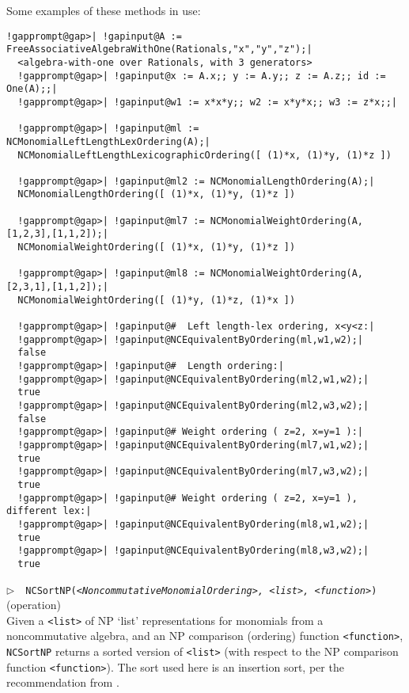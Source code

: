 \documentclass[a4paper,11pt]{report}
\begin{document}
{{{ Some examples of these methods in use: 
\begin{Verbatim}[commandchars=!@|,fontsize=\small,frame=single,label=Example]
  !gapprompt@gap>| !gapinput@A := FreeAssociativeAlgebraWithOne(Rationals,"x","y","z");|
  <algebra-with-one over Rationals, with 3 generators>
  !gapprompt@gap>| !gapinput@x := A.x;; y := A.y;; z := A.z;; id := One(A);;|
  !gapprompt@gap>| !gapinput@w1 := x*x*y;; w2 := x*y*x;; w3 := z*x;;|
  
  !gapprompt@gap>| !gapinput@ml := NCMonomialLeftLengthLexOrdering(A);|
  NCMonomialLeftLengthLexicographicOrdering([ (1)*x, (1)*y, (1)*z ])
  
  !gapprompt@gap>| !gapinput@ml2 := NCMonomialLengthOrdering(A);|
  NCMonomialLengthOrdering([ (1)*x, (1)*y, (1)*z ])
  
  !gapprompt@gap>| !gapinput@ml7 := NCMonomialWeightOrdering(A,[1,2,3],[1,1,2]);|
  NCMonomialWeightOrdering([ (1)*x, (1)*y, (1)*z ])
  
  !gapprompt@gap>| !gapinput@ml8 := NCMonomialWeightOrdering(A,[2,3,1],[1,1,2]);|
  NCMonomialWeightOrdering([ (1)*y, (1)*z, (1)*x ])
  
  !gapprompt@gap>| !gapinput@#  Left length-lex ordering, x<y<z:|
  !gapprompt@gap>| !gapinput@NCEquivalentByOrdering(ml,w1,w2);|
  false
  !gapprompt@gap>| !gapinput@#  Length ordering:|
  !gapprompt@gap>| !gapinput@NCEquivalentByOrdering(ml2,w1,w2);|
  true
  !gapprompt@gap>| !gapinput@NCEquivalentByOrdering(ml2,w3,w2);|
  false
  !gapprompt@gap>| !gapinput@# Weight ordering ( z=2, x=y=1 ):|
  !gapprompt@gap>| !gapinput@NCEquivalentByOrdering(ml7,w1,w2);|
  true
  !gapprompt@gap>| !gapinput@NCEquivalentByOrdering(ml7,w3,w2);|
  true
  !gapprompt@gap>| !gapinput@# Weight ordering ( z=2, x=y=1 ), different lex:|
  !gapprompt@gap>| !gapinput@NCEquivalentByOrdering(ml8,w1,w2);|
  true
  !gapprompt@gap>| !gapinput@NCEquivalentByOrdering(ml8,w3,w2);|
  true
\end{Verbatim}
 

 \noindent\textcolor{FuncColor}{$\triangleright$\ \ \texttt{NCSortNP({\mdseries\slshape {\textless}NoncommutativeMonomialOrdering{\textgreater}, {\textless}list{\textgreater}, {\textless}function{\textgreater}})
\label{NCSortNP}
}\hfill{\scriptsize (operation)}}\\


 Given a \texttt{{\textless}list{\textgreater}} of NP `list' representations for monomials from a noncommutative algebra, and
an NP comparison (ordering) function \texttt{{\textless}function{\textgreater}}, \texttt{NCSortNP} returns a sorted version of \texttt{{\textless}list{\textgreater}} (with respect to the NP comparison function \texttt{{\textless}function{\textgreater}}). The sort used here is an insertion sort, per the recommendation from \cite{gN02}. 

}}}
\end{document}
